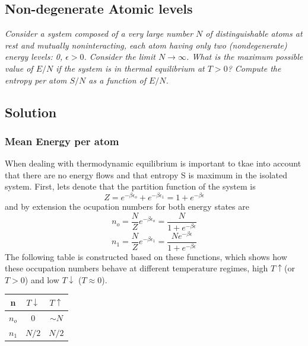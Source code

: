 \documentclass{article}
\begin{document}
\subsection{Non-degenerate Atomic levels}
\textit{Consider a system composed of a very large number $N$ of distinguishable atoms at rest and mutually noninteracting, each atom having only two (nondegenerate) energy levels: 0, $\epsilon > 0$. Consider the limit $N \to \infty$. What is the maximum possible value of $E/N$ if the system is in thermal equilibrium at $T > 0$? Compute the entropy per atom $S/N$ as a function of $E/N$.}
\subsection*{Solution}
\subsubsection*{Mean Energy per atom}
When dealing with thermodynamic equilibrium is important to tkae into account that there are no energy flows and that entropy S is maximum in the isolated system. First, lets denote that the partition function of the system is
\begin{equation}
    Z = e^{-\beta \epsilon_o}+e^{-\beta \epsilon_1} = 1 + e^{-\beta \epsilon}
\end{equation}
and by extension the ocupation numbers for both energy states are
\begin{equation}
    n_o = \frac{N}{Z} e^{-\beta \epsilon_o} = \frac{N}{1 + e^{-\beta \epsilon}} 
\end{equation}
\begin{equation*}
    n_1 = \frac{N}{Z} e^{-\beta \epsilon_1} = \frac{N e^{-\beta \epsilon}}{1 + e^{-\beta \epsilon}}
\end{equation*}
The following table is constructed based on these functions, which shows how these occupation numbers behave at different temperature regimes, high  $T\uparrow$(or $T>0$) and low $T\downarrow$ ($T\approx 0$).

\begin{center}
 \begin{tabular}{c | c c} 
    n & $T\downarrow$ & $T\uparrow$\\
 \hline
    $n_o$ & 0 & $\sim N$\\
    $n_1$ & $N/2$ & $N/2$\\
\end{tabular}
\end{center}
\end{document}
